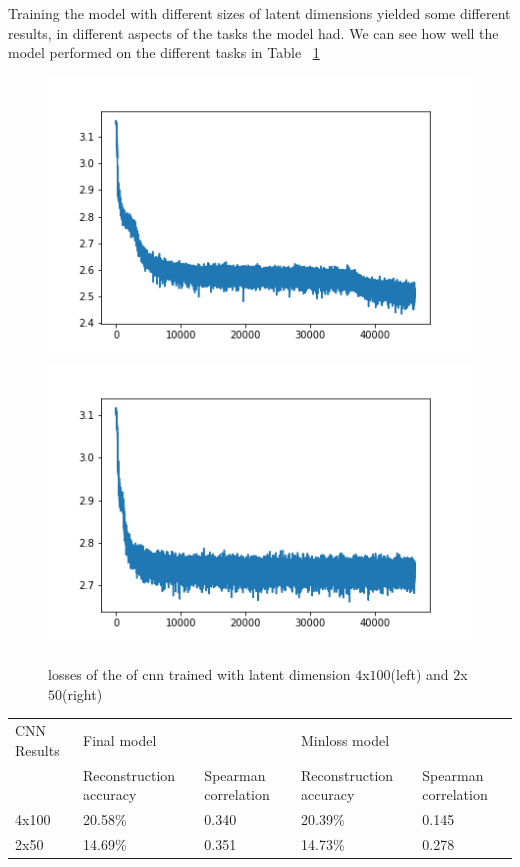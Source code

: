 Training the model with different sizes of latent dimensions yielded some different results, in different aspects of the tasks the model had. We can see how well the model performed on the different tasks in Table ~\ref{tab:cnn_results}\\

\begin{figure}[!ht]
  \centering
  \includegraphics[width=0.4\linewidth]{latex/imgs/CNN_loss_latent_dimension_100.png}
  \includegraphics[width=0.4\linewidth]{latex/imgs/loss_latent_dimension_50.png}
  \caption{losses of the of cnn trained with latent dimension $4$x$100$(left) and $2$x$50$(right)}
  \label{fig:cnn_loss}
\end{figure}

\begin{table}[]
\begin{tabular}{|l|ll|ll|}
\hline
CNN Results & Final model                                  &                      & Minloss model                                &                      \\ \cline{2-5} 
            & \multicolumn{1}{l|}{Reconstruction accuracy} & Spearman correlation & \multicolumn{1}{l|}{Reconstruction accuracy} & Spearman correlation \\ \hline
4x100       & \multicolumn{1}{l|}{20.58\%}                 & 0.340                & \multicolumn{1}{l|}{20.39\%}                 & 0.145                \\ \hline
2x50        & \multicolumn{1}{l|}{14.69\%}                 & 0.351                & \multicolumn{1}{l|}{14.73\%}                 & 0.278                \\ \hline
\end{tabular}
\label{tab:cnn_results}
\end{table}


